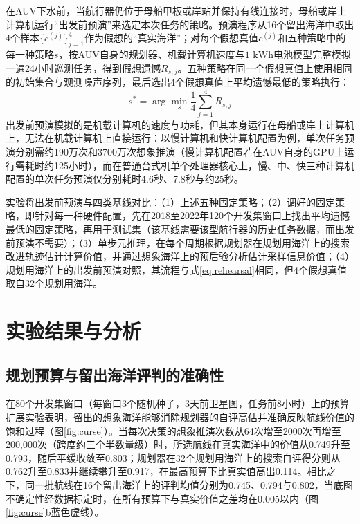 在AUV下水前，当航行器仍位于母船甲板或岸站并保持有线连接时，母船或岸上计算机运行“出发前预演”来选定本次任务的策略。预演程序从16个留出海洋中取出4个样本$\{c^{(j)}\}_{j=1}^4$作为假想的“真实海洋”；对每个假想真值$c^{(j)}$和五种策略中的每一种策略$s$，按AUV自身的规划器、机载计算机速度与$1\text{ kWh}$电池模型完整模拟一遍24小时巡测任务，得到假想遗憾$R_{s,j}$。五种策略在同一个假想真值上使用相同的初始集合与观测噪声序列，最后选出4个假想真值上平均遗憾最低的策略执行：
\begin{equation}
  s^* = \arg\min_{s} \frac{1}{4}\sum_{j=1}^4 R_{s,j}
  \label{eq:rehearsal}
\end{equation}
出发前预演模拟的是机载计算机的速度与功耗，但其本身运行在母船或岸上计算机上，无法在机载计算机上直接运行：以慢计算机和快计算机配置为例，单次任务预演分别需约190万次和3700万次想象推演（慢计算机配置若在AUV自身的GPU上运行需耗时约125小时），而在普通台式机单个处理器核心上，慢、中、快三种计算机配置的单次任务预演仅分别耗时4.6秒、7.8秒与约25秒。

实验将出发前预演与四类基线对比：（1）上述五种固定策略；（2）调好的固定策略，即针对每一种硬件配置，先在2018至2022年120个开发集窗口上找出平均遗憾最低的固定策略，再用于测试集（该基线需要该型航行器的历史任务数据，而出发前预演不需要）；（3）单步元推理\cite{russell1991right}，在每个周期根据规划器在规划用海洋上的搜索改进轨迹估计计算价值，并通过想象海洋上的预后验分析估计采样信息价值；（4）规划用海洋上的出发前预演对照，其流程与式\eqref{eq:rehearsal}相同，但4个假想真值取自32个规划用海洋。

\section{实验结果与分析}

\subsection{规划预算与留出海洋评判的准确性}

在80个开发集窗口（每窗口3个随机种子，3天前卫星图，任务前8小时）上的预算扩展实验表明，留出的想象海洋能够消除规划器的自评高估并准确反映航线价值的饱和过程（图\ref{fig:curse}）。当每次决策的想象推演次数从64次增至2000次再增至200,000次（跨度约三个半数量级）时，所选航线在真实海洋中的价值从0.749升至0.793，随后平缓收敛至0.803；规划器在32个规划用海洋上的搜索自评得分则从0.762升至0.833并继续攀升至0.917，在最高预算下比真实值高出0.114。相比之下，同一批航线在16个留出海洋上的评判均值分别为0.745、0.794与0.802，当底图不确定性经数据标定时，在所有预算下与真实价值之差均在0.005以内（图\ref{fig:curse}b蓝色虚线）。

